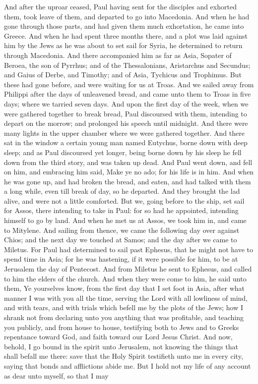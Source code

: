 And after the uproar ceased, Paul having sent for the disciples and exhorted them, took leave of them, and departed to go into Macedonia. And when he had gone through those parts, and had given them much exhortation, he came into Greece. And when he had spent three months there, and a plot was laid against him by the Jews as he was about to set sail for Syria, he determined to return through Macedonia. And there accompanied him as far as Asia, Sopater of Beroea, the son of Pyrrhus; and of the Thessalonians, Aristarchus and Secundus; and Gaius of Derbe, and Timothy; and of Asia, Tychicus and Trophimus. But these had gone before, and were waiting for us at Troas. And we sailed away from Philippi after the days of unleavened bread, and came unto them to Troas in five days; where we tarried seven days.  And upon the first day of the week, when we were gathered together to break bread, Paul discoursed with them, intending to depart on the morrow; and prolonged his speech until midnight. And there were many lights in the upper chamber where we were gathered together. And there sat in the window a certain young man named Eutychus, borne down with deep sleep; and as Paul discoursed yet longer, being borne down by his sleep he fell down from the third story, and was taken up dead. And Paul went down, and fell on him, and embracing him said, Make ye no ado; for his life is in him. And when he was gone up, and had broken the bread, and eaten, and had talked with them a long while, even till break of day, so he departed. And they brought the lad alive, and were not a little comforted.  But we, going before to the ship, set sail for Assos, there intending to take in Paul: for so had he appointed, intending himself to go by land. And when he met us at Assos, we took him in, and came to Mitylene. And sailing from thence, we came the following day over against Chios; and the next day we touched at Samos; and the day after we came to Miletus. For Paul had determined to sail past Ephesus, that he might not have to spend time in Asia; for he was hastening, if it were possible for him, to be at Jerusalem the day of Pentecost.  And from Miletus he sent to Ephesus, and called to him the elders of the church. And when they were come to him, he said unto them, Ye yourselves know, from the first day that I set foot in Asia, after what manner I was with you all the time, serving the Lord with all lowliness of mind, and with tears, and with trials which befell me by the plots of the Jews; how I shrank not from declaring unto you anything that was profitable, and teaching you publicly, and from house to house, testifying both to Jews and to Greeks repentance toward God, and faith toward our Lord Jesus Christ. And now, behold, I go bound in the spirit unto Jerusalem, not knowing the things that shall befall me there: save that the Holy Spirit testifieth unto me in every city, saying that bonds and afflictions abide me. But I hold not my life of any account as dear unto myself, so that I may 